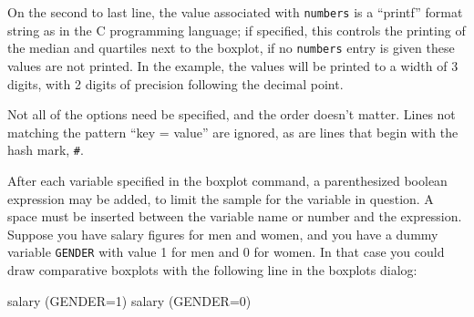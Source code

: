 On the second to last line, the value associated with \verb+numbers+
is a ``printf'' format string as in the C programming language; if
specified, this controls the printing of the median and quartiles next
to the boxplot, if no \verb+numbers+ entry is given these values are
not printed.  In the example, the values will be printed to a width of
3 digits, with 2 digits of precision following the decimal point.

Not all of the options need be specified, and the order doesn't
matter.  Lines not matching the pattern ``key = value'' are ignored,
as are lines that begin with the hash mark, \verb+#+.

After each variable specified in the boxplot command, a parenthesized
boolean expression may be added, to limit the sample for the variable
in question.  A space must be inserted between the variable name or
number and the expression.  Suppose you have salary figures for men
and women, and you have a dummy variable \verb+GENDER+ with value 1
for men and 0 for women.  In that case you could draw comparative
boxplots with the following line in the boxplots dialog:

\begin{code}
salary (GENDER=1) salary (GENDER=0)
\end{code}



